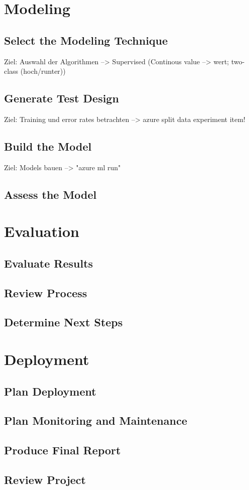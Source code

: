 \section{Modeling}
\subsection{Select the Modeling Technique}
Ziel: Auswahl der Algorithmen
--> Supervised (Continous value --> wert; two-class (hoch/runter))

\subsection{Generate Test Design}
Ziel: Training und error rates betrachten
--> azure split data experiment item!

\subsection{Build the Model}
Ziel: Models bauen
--> "azure ml run"

\subsection{Assess the Model}


\section{Evaluation}
\subsection{Evaluate Results}
\subsection{Review Process}
\subsection{Determine Next Steps}


\section{Deployment}
\subsection{Plan Deployment}
\subsection{Plan Monitoring and Maintenance}
\subsection{Produce Final Report}
\subsection{Review Project}


